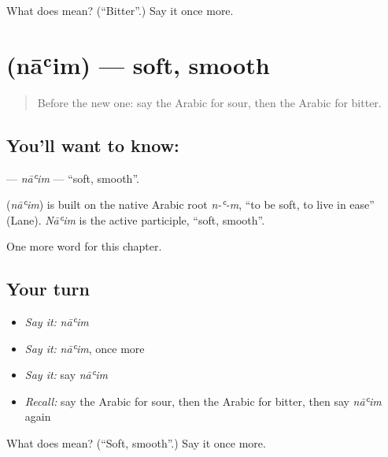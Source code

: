 \begin{tcolorbox}[breakable,colback=teal!4,colframe=teal!35!black,title={Before you move on}]
What does  mean? (\textquotedblleft{}Bitter\textquotedblright{}.) Say it once more.
\end{tcolorbox}
\section[\texorpdfstring{\ar{ناعم} (nāʿim)}{ناعم (nāʿim)}]{ (nāʿim) — soft, smooth}

\label{lesson:AR-C152-naim}



\begin{quote}
Before the new one: say the Arabic for sour, then the Arabic for bitter.
\end{quote}

\subsection*{You'll want to know: }
\textbf{} — \emph{nāʿim} — \textquotedblleft{}soft, smooth\textquotedblright{}.

\begin{cousinweb}
\textbf{} (\emph{nāʿim}) is built on the native Arabic root \emph{n-ʿ-m}, \textquotedblleft{}to be soft, to live in ease\textquotedblright{} (Lane). \emph{Nāʿim} is the active participle, \textquotedblleft{}soft, smooth\textquotedblright{}.
\end{cousinweb}

\begin{grammarlens}[title={What you've built}]
One more word for this chapter.
\end{grammarlens}

\subsection*{Your turn}
\begin{itemize}
\raggedright
  \item \emph{Say it:} \emph{nāʿim}
  \item \emph{Say it:} \emph{nāʿim}, once more
  \item \emph{Say it:} say \emph{nāʿim}
  \item \emph{Recall:} say the Arabic for sour, then the Arabic for bitter, then say \emph{nāʿim} again
\end{itemize}

\begin{tcolorbox}[breakable,colback=teal!4,colframe=teal!35!black,title={Before you move on}]
What does  mean? (\textquotedblleft{}Soft, smooth\textquotedblright{}.) Say it once more.
\end{tcolorbox}
